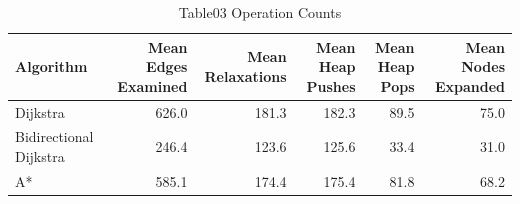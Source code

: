 \begin{table}[htbp]
\centering
\caption{Table03 Operation Counts}
\begin{tabular}{lrrrrr}
\hline
Algorithm & Mean Edges Examined & Mean Relaxations & Mean Heap Pushes & Mean Heap Pops & Mean Nodes Expanded \\
\hline
Dijkstra & 626.0 & 181.3 & 182.3 & 89.5 & 75.0 \\
Bidirectional Dijkstra & 246.4 & 123.6 & 125.6 & 33.4 & 31.0 \\
A* & 585.1 & 174.4 & 175.4 & 81.8 & 68.2 \\
\hline
\end{tabular}
\end{table}
